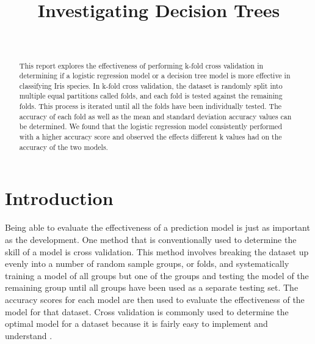\documentclass[journal]{IEEEtran}
\begin{document}
\setlength{\emergencystretch}{12pt}
\setlength{\parindent}{10pt}



\lstset{style=mystyle}

\title{Investigating Decision Trees}

\author{
\\
}

\maketitle

\begin{abstract}
\label{log:abstract}
This report explores the effectiveness of performing k-fold cross validation in determining if a logistic regression model or a decision tree model is more effective in classifying Iris species. In k-fold cross validation, the dataset is randomly split into multiple equal partitions called folds, and each fold is tested against the remaining folds. This process is iterated until all the folds have been individually tested. The accuracy of each fold as well as the mean and standard deviation accuracy values can be determined. We found that the logistic regression model consistently performed with a higher accuracy score and observed the effects different k values had on the accuracy of the two models. 
\end{abstract}

\section{Introduction}
\label{sec:introduction}
Being able to evaluate the effectiveness of a prediction model is just as important as the development. One method that is conventionally used to determine the skill of a model is cross validation. This method involves breaking the dataset up evenly into a number of random sample groups, or folds, and systematically training a model of all groups but one of the groups and testing the model of the remaining group until all groups have been used as a separate testing set. The accuracy scores for each model are then used to evaluate the effectiveness of the model for that dataset. Cross validation is commonly used to determine the optimal model for a dataset because it is fairly easy to implement and understand \cite{b1}. 
\end{document}
